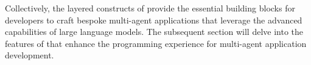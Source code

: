 Collectively, the layered constructs of \ours provide the essential building blocks for developers to craft bespoke multi-agent applications that leverage the advanced capabilities of large language models. The subsequent section will delve into the features of \ours that enhance the programming experience for multi-agent application development.
